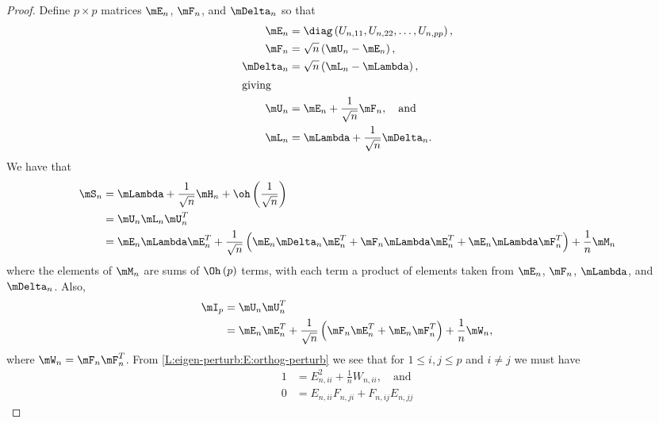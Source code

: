 \begin{proof}
Define $p\times p$ matrices $\mE_n$, $\mF_n$, and $\mDelta_n$ so that
\begin{align}
    \mE_n
        &=
        \diag \left(
            U_{n,11},
            U_{n,22},
            \ldots,
            U_{n,pp}
        \right), \\
    \mF_n 
        &= 
        \sqrt{n} \left( \mU_n - \mE_n \right), \\
    \mDelta_{n}
        &=
        \sqrt{n} \left( \mL_n - \mLambda \right), \\
\intertext{giving}
    \mU_n
        &= \mE_n + \frac{1}{\sqrt{n}} \mF_n, \quad \text{and} \notag \\
    \mL_n
        &= \mLambda + \frac{1}{\sqrt{n}} \mDelta_{n}. \notag
\end{align}
We have that 
\begin{align}
    \mS_n 
    &= \mLambda 
       + \frac{1}{\sqrt{n}} \mH_n 
       + \oh \left( \frac{1}{\sqrt{n}}\right) \notag \\
    &= \mU_n \mL_n \mU_n^T \notag \\
    &= \mE_n \mLambda \mE_n^T
       + 
       \frac{1}{\sqrt{n}} \left(
           \mE_n \mDelta_n \mE_n^T
           +
           \mF_n \mLambda \mE_n^T
           +
           \mE_n \mLambda \mF_n^T
       \right)
       +
       \frac{1}{n}
       \mM_n \label{L:eigen-perturb:E:eigen-perturb}
\end{align}
where the elements of $\mM_n$ are sums of $\Oh\left( p \right)$ terms, with each term a product of elements taken from $\mE_n$, $\mF_n$, $\mLambda$, and $\mDelta_n$.  Also,
\begin{align}
    \mI_p
    &= \mU_n \mU_n^T \notag \\
    &= \mE_n \mE_n^T
       + 
       \frac{1}{\sqrt{n}} \left(
           \mF_n \mE_n^T
           +
           \mE_n \mF_n^T
       \right)
       + 
       \frac{1}{n}
       \mW_n, \label{L:eigen-perturb:E:orthog-perturb}
\end{align}
where $\mW_n = \mF_n \mF_n^T$.
From \eqref{L:eigen-perturb:E:orthog-perturb} we see that for $1 \leq i,j \leq p$ and $i \neq j$ we must have
\begin{subequations}
\begin{align}
    1 &= E_{n,ii}^2 
         + 
         \frac{1}{n} W_{n,ii}, 
         \quad \text{and}
         \label{L:eigen-perturb:E:orthog-perturb-1} \\
    0 &= E_{n,ii} F_{n,ji} 
         + 
         F_{n,ij} E_{n,jj} 

\end{align}
\end{subequations}
\end{proof}
